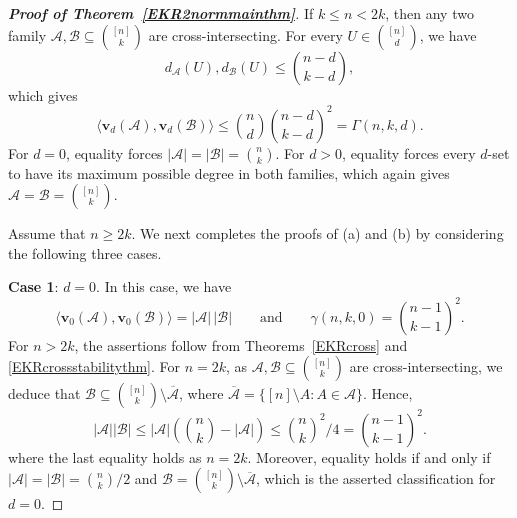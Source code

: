 \documentclass[11pt]{article}
\numberwithin{equation}{section}
\def\A{\mathcal{A}}
\def\B{\mathcal{B}}
\begin{document}
\begin{proof}[{\bf Proof of Theorem~\ref{EKR2normmainthm}}]
If $k\leq n<2k$,
then any two family $\A,\B\subseteq \binom{[n]}{k}$ are cross-intersecting.
For every
$U\in\binom{[n]}d$, we have
\[
d_{\mathcal A}(U),d_{\mathcal B}(U)
\leq\binom{n-d}{k-d},
\]
which gives
\[
\big\langle\mathbf v_d(\mathcal A),\mathbf v_d(\mathcal B)\big\rangle
\leq\binom nd\binom{n-d}{k-d}^{2}=\Gamma(n,k,d).
\]
For $d=0$, equality forces $|\mathcal A|=|\mathcal B|=\binom nk$.
For $d>0$, equality forces every $d$-set to have its maximum possible degree in both families, which again gives
$\mathcal A=\mathcal B=\binom{[n]}k$.



Assume that $n\geq2k$.
We next completes the proofs of (a) and (b) by considering the following three cases.

{\bf Case 1}: $d=0$.
In this case, we have
\[
\big\langle\mathbf{v}_0(\mathcal{A}),
\mathbf{v}_0(\mathcal{B})\big\rangle
=|\mathcal{A}|\,|\mathcal{B}|
\qquad\text{and}\qquad
\gamma(n,k,0)=\binom{n-1}{k-1}^2.
\]
For $n>2k$, the assertions follow from Theorems~\ref{EKRcross} and
\ref{EKRcrossstabilitythm}.
For $n=2k$, as $\A,\B\subseteq \binom{[n]}{k}$ are cross-intersecting, we deduce that $\mathcal B\subseteq\binom{[n]}k\setminus\overline{\mathcal A}$, where $\overline{\mathcal A}=\{[n]\setminus A:A\in\mathcal A\}$.
Hence,
\[
|\mathcal A||\mathcal B|\leq |\A|(\binom{n}{k}-|\A|)
\leq \binom{n}{k}^2/4=\binom{n-1}{k-1}^2.
\]
where the last equality holds as $n=2k$.
Moreover, equality holds if and only if $|\mathcal A|=|\mathcal B|=\binom{n}{k}/2$ and
$\mathcal B=\binom{[n]}k\setminus\overline{\mathcal A}$, which is
the asserted classification for $d=0$.


\end{proof}
\end{document}
